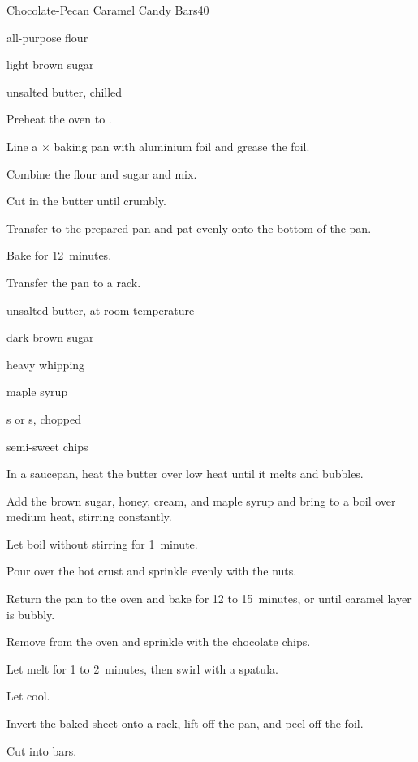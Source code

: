 \begin{recipe}{Chocolate-Pecan Caramel Candy Bars}{}{40}


\begin{ingredients}
\item \C{1 \half} all-purpose flour
\item \C{\half} light brown sugar
\item \C{\half} unsalted butter, chilled
\end{ingredients}

\begin{directions}
\item Preheat the oven to .
\item Line a $\times$ baking pan with aluminium foil and grease the foil.
\item Combine the flour and sugar and mix.
\item Cut in the butter until crumbly.
\item Transfer to the prepared pan and pat evenly onto the bottom of the pan.
\item Bake for 12~minutes.
\item Transfer the pan to a rack.
\end{directions}


\begin{ingredients}
\item {} unsalted butter, at room-temperature
\item {} dark brown sugar
\item {} 
\item {} heavy whipping 
\item {} maple syrup
\item \C{1 \half} s or s, chopped
\item \C{\half} semi-sweet  chips
\end{ingredients}

\begin{directions}
\item In a saucepan, heat the butter over low heat until it melts and bubbles.
\item Add the brown sugar, honey, cream, and maple syrup and bring to a boil over medium heat, stirring constantly.
\item Let boil without stirring for 1~minute.
\item Pour over the hot crust and sprinkle evenly with the nuts.
\item Return the pan to the oven and bake for 12 to 15~minutes, or until caramel layer is bubbly.
\item Remove from the oven and sprinkle with the chocolate chips.
\item Let melt for 1 to 2~minutes, then swirl with a spatula.
\item Let cool.
\item Invert the baked sheet onto a rack, lift off the pan, and peel off the foil.
\item Cut into bars.
\end{directions}

\end{recipe}
